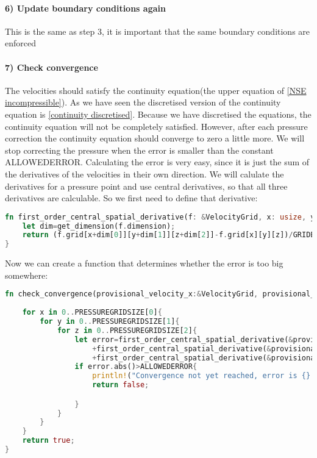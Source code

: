 \documentclass{article}
\begin{document}
\paragraph{6) Update boundary conditions again}
This is the same as step 3, it is important that the same boundary conditions are enforced
\paragraph{7) Check convergence}
The velocities should satisfy the continuity equation(the upper equation of \ref{NSE incompressible}). As we have seen the discretised version of the continuity equation is \ref{continuity discretised}. Because we have discretised the equations, the continuity equation will not be completely satisfied. However, after each pressure correction the continuity equation should converge to zero a little more. We will stop correcting the pressure when the error is smaller than the constant ALLOWEDERROR. Calculating the error is very easy, since it is just the sum of the derivatives of the velocities in their own direction. We will calulate the derivatives for a pressure point and use central derivatives, so that all three derivatives are calculable. So we first need to define that derivative:

\begin{lstlisting}[language=Rust, style=boxed, breaklines=true]
fn first_order_central_spatial_derivative(f: &VelocityGrid, x: usize, y: usize, z:usize)->f32{//practically identical to first_order_forward_spatial_derivative, but for clarity we keep it.
    let dim=get_dimension(f.dimension);
    return (f.grid[x+dim[0]][y+dim[1]][z+dim[2]]-f.grid[x][y][z])/GRIDELEMENTSCALE;
}
\end{lstlisting}
Now we can create a function that determines whether the error is too big somewhere:
\begin{lstlisting}[language=Rust, style=boxed, breaklines=true]
fn check_convergence(provisional_velocity_x:&VelocityGrid, provisional_velocity_y: &VelocityGrid, provisional_velocity_z: &VelocityGrid)->bool{
    
    for x in 0..PRESSUREGRIDSIZE[0]{
        for y in 0..PRESSUREGRIDSIZE[1]{
            for z in 0..PRESSUREGRIDSIZE[2]{
                let error=first_order_central_spatial_derivative(&provisional_velocity_x, x, y, z)
                    +first_order_central_spatial_derivative(&provisional_velocity_y, x, y, z)
                    +first_order_central_spatial_derivative(&provisional_velocity_z, x, y, z);    
                if error.abs()>ALLOWEDERROR{
                    println!("Convergence not yet reached, error is {} at ({}, {}, {})", error, x, y, z );
                    return false;

                }
            }
        }
    } 
    return true;
}
\end{lstlisting}
\end{document}
